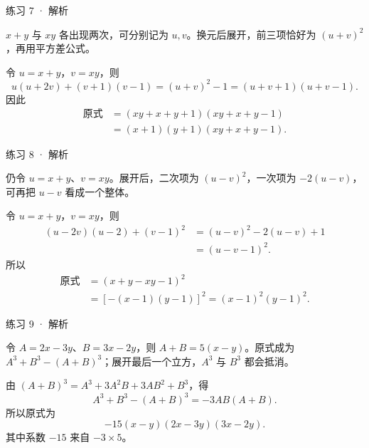 
\begin{solution}[before skip=4pt plus 1pt,after skip=4pt plus 1pt,top=6pt,bottom=6pt]{练习 7 · 解析}

\think $x+y$ 与 $xy$ 各出现两次，可分别记为 $u,v$。换元后展开，前三项恰好为 $(u+v)^2$，再用平方差公式。

\solve 令 $u=x+y$，$v=xy$，则
\[u(u+2v)+(v+1)(v-1)=(u+v)^2-1=(u+v+1)(u+v-1).\]
因此
\begin{align*}
\text{原式}&=(xy+x+y+1)(xy+x+y-1)\\
&=(x+1)(y+1)(xy+x+y-1).
\end{align*}


\end{solution}


\begin{solution}[before skip=4pt plus 1pt,after skip=4pt plus 1pt,top=6pt,bottom=6pt]{练习 8 · 解析}

\think 仍令 $u=x+y$、$v=xy$。展开后，二次项为 $(u-v)^2$，一次项为 $-2(u-v)$，可再把 $u-v$ 看成一个整体。

\solve 令 $u=x+y$，$v=xy$，则
\begin{align*}
(u-2v)(u-2)+(v-1)^2&=(u-v)^2-2(u-v)+1\\
&=(u-v-1)^2.
\end{align*}
所以
\begin{align*}
\text{原式}&=(x+y-xy-1)^2\\
&=[-(x-1)(y-1)]^2=(x-1)^2(y-1)^2.
\end{align*}


\end{solution}


\begin{solution}[before skip=4pt plus 1pt,after skip=4pt plus 1pt,top=6pt,bottom=6pt]{练习 9 \starred · 解析}

\think 令 $A=2x-3y$、$B=3x-2y$，则 $A+B=5(x-y)$。原式成为 $A^3+B^3-(A+B)^3$；展开最后一个立方，$A^3$ 与 $B^3$ 都会抵消。

\solve 由 $(A+B)^3=A^3+3A^2B+3AB^2+B^3$，得
\[A^3+B^3-(A+B)^3=-3AB(A+B).\]
所以原式为
\[-15(x-y)(2x-3y)(3x-2y).\]
其中系数 $-15$ 来自 $-3\times5$。


\end{solution}


